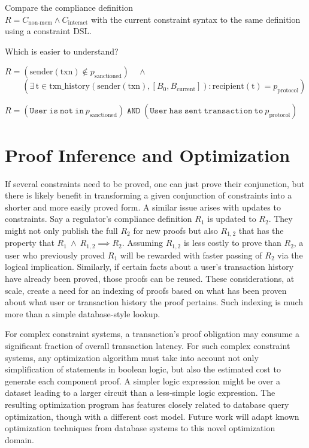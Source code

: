 \documentclass[9pt]{extreport}
\begin{document}
Compare the compliance definition \\$R = C_\text{non-mem} \land C_\text{interact}$ with the current constraint syntax to the same definition using a constraint DSL.  

Which is easier to understand?

\begin{codebox}
\zi $R = \left(\text{sender}(\text{txn}) \notin p_{\text{sanctioned}}\right) \quad \land\;$
\zi $\phantom{R = }\left(\exists \, \text{t} \in \text{txn\_history}(\text{sender}(\text{txn}), [B_0, B_{\text{current}}]) : \text{recipient}(\text{t}) = p_{\text{protocol}}\right)$
\end{codebox}


\begin{codebox}
\zi \centering $R = \left(\mathtt{User\ is\ not\ in\ } p_{\text{sanctioned}}\right) \;\mathtt{AND}\; \left(\mathtt{User\ has\ sent\ transaction\ to\ } p_{\text{protocol}}\right)$
\end{codebox}

\section{Proof Inference and Optimization}
\label{sec:proof-inference-and-optimization}

If several constraints need to be proved, one can just prove their conjunction, but there is likely benefit in transforming a given conjunction of constraints into a shorter and more easily proved form.  A similar issue arises with updates to constraints.
Say a regulator's compliance definition $R_1$ is updated to $R_2$.  They might not only publish the full $R_2$ for new proofs but also $R_{1,2}$ that has the property that $R_1\ \land\ R_{1,2} \implies R_2$.  Assuming $R_{1,2}$ is less costly to prove than $R_2$, a user who previously proved $R_1$ will be rewarded with faster passing of $R_2$ via the logical implication.  
Similarly, if certain facts about a user's transaction history have already been proved, those proofs can be reused.
These considerations, at scale, create a need for an 
indexing of proofs based on what has been proven about what user or transaction history the proof pertains.  Such indexing is much more than a simple database-style lookup.

For complex constraint systems, a transaction's proof obligation may consume a significant fraction of
overall transaction latency.  For such complex
constraint systems, any optimization algorithm must take into account not only simplification of statements
in boolean logic, but also the estimated cost to generate each component proof.  A simpler logic expression might be over a dataset leading to a larger circuit than a less-simple logic expression.  The resulting optimization program has features closely related to database query optimization, though with a different cost model.  Future work will adapt known optimization techniques from database systems \cite{DSC} to this novel optimization domain.  
\end{document}
